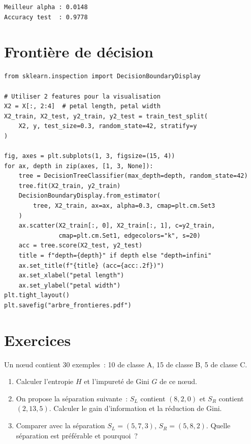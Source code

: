 \begin{codeoutput}
\begin{verbatim}
Meilleur alpha : 0.0148
Accuracy test  : 0.9778
\end{verbatim}
\end{codeoutput}

\section{Fronti\`ere de d\'ecision}
\label{sec:arbres-frontiere}

\begin{codeblock}[title=\textbf{Visualisation de la fronti\`ere de d\'ecision}]
\begin{verbatim}
from sklearn.inspection import DecisionBoundaryDisplay

# Utiliser 2 features pour la visualisation
X2 = X[:, 2:4]  # petal length, petal width
X2_train, X2_test, y2_train, y2_test = train_test_split(
    X2, y, test_size=0.3, random_state=42, stratify=y
)

fig, axes = plt.subplots(1, 3, figsize=(15, 4))
for ax, depth in zip(axes, [1, 3, None]):
    tree = DecisionTreeClassifier(max_depth=depth, random_state=42)
    tree.fit(X2_train, y2_train)
    DecisionBoundaryDisplay.from_estimator(
        tree, X2_train, ax=ax, alpha=0.3, cmap=plt.cm.Set3
    )
    ax.scatter(X2_train[:, 0], X2_train[:, 1], c=y2_train,
               cmap=plt.cm.Set1, edgecolors="k", s=20)
    acc = tree.score(X2_test, y2_test)
    title = f"depth={depth}" if depth else "depth=infini"
    ax.set_title(f"{title} (acc={acc:.2f})")
    ax.set_xlabel("petal length")
    ax.set_ylabel("petal width")
plt.tight_layout()
plt.savefig("arbre_frontieres.pdf")
\end{verbatim}
\end{codeblock}

\section{Exercices}
\label{sec:exercises-ch6}

\begin{exercice}
Un n\oe{}ud contient 30 exemples~: 10 de classe A, 15 de classe B, 5 de
classe C.
\begin{enumerate}
  \item Calculer l'entropie $H$ et l'impuret\'e de Gini $G$ de ce n\oe{}ud.
  \item On propose la s\'eparation suivante~: $S_L$ contient $(8, 2, 0)$ et
    $S_R$ contient $(2, 13, 5)$. Calculer le gain d'information et la
    r\'eduction de Gini.
  \item Comparer avec la s\'eparation $S_L = (5, 7, 3)$, $S_R = (5, 8, 2)$.
    Quelle s\'eparation est pr\'ef\'erable et pourquoi~?
\end{enumerate}
\end{exercice}

